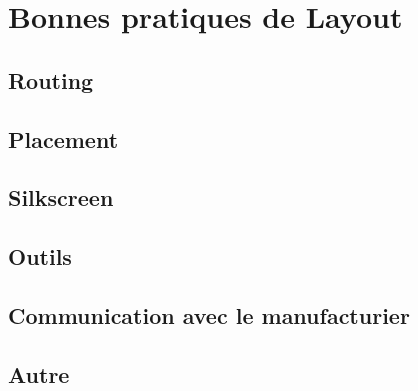 
\section{Bonnes pratiques de Layout}

\subsection{Routing}

\subsection{Placement}

\subsection{Silkscreen}

\subsection{Outils}

\subsection{Communication avec le manufacturier}

\subsection{Autre}
